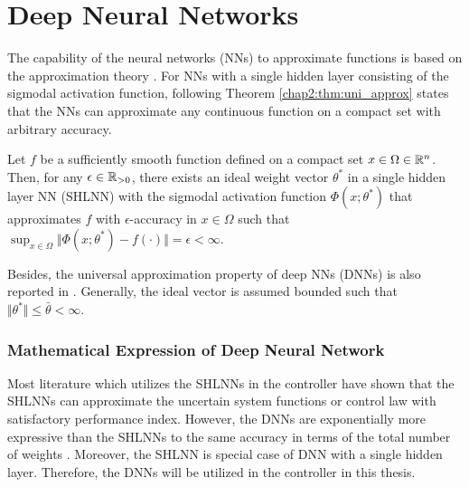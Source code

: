 \section{Deep Neural Networks}


The capability of the neural networks (NNs) to approximate functions is based on the approximation theory \cite{RN4}. 
For NNs with a single hidden layer consisting of the sigmodal activation function, following Theorem \ref{chap2:thm:uni_approx} states that the NNs can approximate any continuous function on a compact set with arbitrary accuracy.
\begin{theorem}

  Let $f$ be a sufficiently smooth function defined on a compact set $x\in\Omega\in\mathbb{R}^n$.
  Then, for any $\epsilon\in\mathbb{R}_{>0}$, there exists an ideal weight vector $\theta^*$ in a single hidden layer NN (SHLNN) with the sigmodal activation function $\Phi(x;\theta^*)$ that approximates $f$ with $\epsilon$-accuracy in $x\in\Omega$ such that $\sup_{x\in\Omega}\Vert \Phi(x;\theta^*) - f(\cdot) \Vert = \epsilon < \infty$.

  \label{chap2:thm:uni_approx}
\end{theorem}
Besides, the universal approximation property of deep NNs (DNNs) is also reported in \cite{RN70}.
Generally, the ideal vector is assumed bounded such that $\Vert\theta^*\Vert\le \bar\theta <\infty$.

\subsubsection{Mathematical Expression of Deep Neural Network} \label{chap2:sec:DNN}

Most literature which utilizes the SHLNNs in the controller have shown that the SHLNNs can approximate the uncertain system functions or control law with satisfactory performance index.
However, the DNNs are exponentially more expressive than the SHLNNs to the same accuracy in terms of the total number of weights \cite{RN65}.
Moreover, the SHLNN is special case of DNN with a single hidden layer.
Therefore, the DNNs will be utilized in the controller in this thesis.

